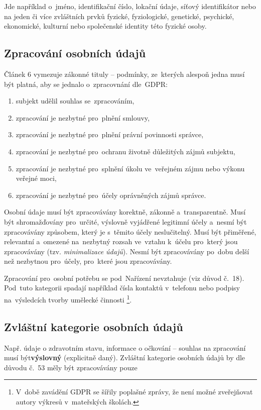 Jde například o~jméno, identifikační číslo, lokační údaje, síťový identifikátor nebo na jeden či více zvláštních prvků fyzické, fyziologické, genetické, psychické, ekonomické, kulturní nebo společenské identity této fyzické osoby.

\subsection{Zpracování osobních údajů}

Článek 6 vymezuje zákonné tituly -- podmínky, ze~kterých alespoň jedna musí být platná, aby se jednalo o~zpracovnání dle~GDPR:

\begin{enumerate}[label=\alph*)]
\item subjekt udělil souhlas se~zpracováním,
\item zpracování je nezbytné pro~plnění smlouvy,
\item zpracování je nezbytné pro~plnění právní povinnosti správce,
\item zpracování je nezbytné pro~ochranu životně důležitých zájmů subjektu,
\item zpracování je nezbytné pro~splnění úkolu ve~veřejném zájmu nebo výkonu veřejné moci,
\item zpracování je nezbytné pro~účely oprávněných zájmů správce.
\end{enumerate}

Osobní údaje musí být zpracovávány korektně, zákonně a~transparentně.
Musí být shromažďovány pro~určité, výslovně vyjádřené legitimní účely a~nesmí být zpracovávány způsobem, který je s~těmito účely neslučitelný.
Musí být přiměřené, relevantní a~omezené na~nezbytný rozsah ve~vztahu k~účelu pro~který jsou zpracovávány (tzv. \emph{minimalizace údajů}).
Nesmí být zpracovávány po~dobu delší než nezbytnou pro~účely, pro~které jsou zpracovávány.

Zpracování pro~osobní potřebu se pod~Nařízení nevztahuje (viz důvod č.~18).
Pod~tuto kategorii spadají například čísla kontaktů v~telefonu nebo podpisy na~výsledcích tvorby umělecké činnosti%
\footnote{V~době zavádění GDPR se šířily poplašné zprávy, že není možné zveřejňovat autory výkresů v~mateřských školách.}.

\subsection{Zvláštní kategorie osobních údajů}
Např. údaje o zdravotním stavu, informace o očkování -- souhlas na zpracování musí být\textbf{výslovný} (explicitně daný).
Zvláštní kategorie osobních údajů by dle důvodu č.~53 měly být zpracovávány pouze

